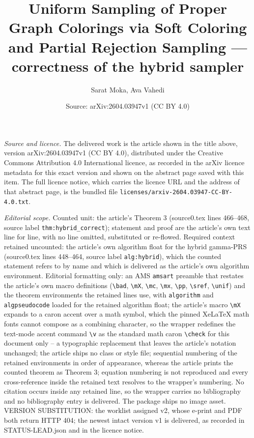 \documentclass[10pt,a4paper]{amsart}
\title[Uniform Sampling of Proper Graph Colorings via Soft Coloring and Partial Rejection Sampling]{Uniform Sampling of Proper Graph Colorings via Soft Coloring and Partial Rejection Sampling — correctness of the hybrid sampler}
\author{Sarat Moka, Ava Vahedi}
\date{Source: arXiv:2604.03947v1 (CC BY 4.0)}
\theoremstyle{plain}
\theoremstyle{definition}
\theoremstyle{remark}
\begin{document}
\maketitle

\noindent\emph{Source and licence.} The delivered work is the article shown in the title above, version arXiv:2604.03947v1 (CC BY 4.0), distributed under the Creative Commons Attribution 4.0 International licence, as recorded in the arXiv licence metadata for this exact version and shown on the abstract page saved with this item. The full licence notice, which carries the licence URL and the address of that abstract page, is the bundled file \texttt{licenses/arxiv-2604.03947-CC-BY-4.0.txt}.\par\smallskip

\noindent\textit{Editorial scope.} Counted unit: the article's Theorem 3 (source0.tex lines 466--468, source label \texttt{thm:hybrid\_correct}); statement and proof are the article's own text line for line, with no line omitted, substituted or re-flowed. Required context retained uncounted: the article's own algorithm float for the hybrid gamma-PRS (source0.tex lines 448--464, source label \texttt{alg:hybrid}), which the counted statement refers to by name and which is delivered as the article's own algorithm environment. Editorial formatting only: an AMS \texttt{amsart} preamble that restates the article's own macro definitions (\texttt{\textbackslash bad}, \texttt{\textbackslash mX}, \texttt{\textbackslash mc}, \texttt{\textbackslash mx}, \texttt{\textbackslash pp}, \texttt{\textbackslash sref}, \texttt{\textbackslash unif}) and the theorem environments the retained lines use, with \texttt{algorithm} and \texttt{algpseudocode} loaded for the retained algorithm float; the article's macro \texttt{\textbackslash mX} expands to a caron accent over a math symbol, which the pinned XeLaTeX math fonts cannot compose as a combining character, so the wrapper redefines the text-mode accent command \texttt{\textbackslash v} as the standard math caron \texttt{\textbackslash check} for this document only -- a typographic replacement that leaves the article's notation unchanged; the article ships no class or style file; sequential numbering of the retained environments in order of appearance, whereas the article prints the counted theorem as Theorem 3; equation numbering is not reproduced and every cross-reference inside the retained text resolves to the wrapper's numbering. No citation occurs inside any retained line, so the wrapper carries no bibliography and no bibliography entry is delivered. The package ships no image asset. VERSION SUBSTITUTION: the worklist assigned v2, whose e-print and PDF both return HTTP 404; the newest intact version v1 is delivered, as recorded in STATUS-LEAD.json and in the licence notice.
\end{document}
